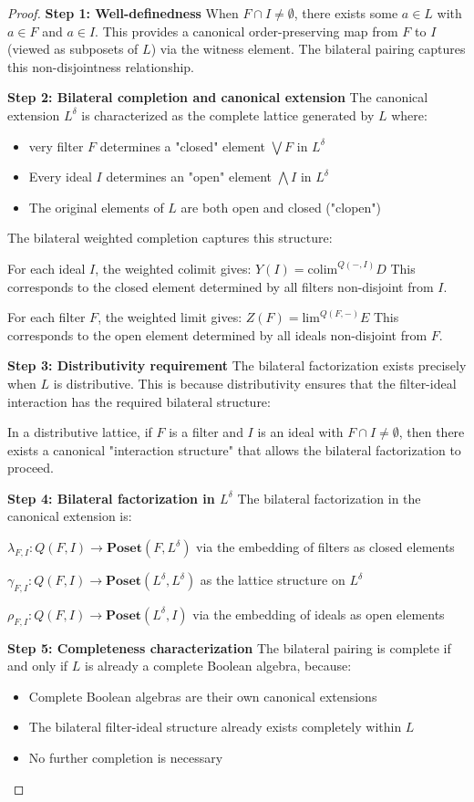 \documentclass[11pt]{article}
\theoremstyle{plain}
\theoremstyle{definition}
\theoremstyle{remark}
\newcommand{\colim}{\mathrm{colim}}
\renewcommand{\lim}{\mathrm{lim}}
\begin{document}
\begin{proof}
\textbf{Step 1: Well-definedness}
When $F \cap I \neq \emptyset$, there exists some $a \in L$ with $a \in F$ and $a \in I$. This provides a canonical order-preserving map from $F$ to $I$ (viewed as subposets of $L$) via the witness element. The bilateral pairing captures this non-disjointness relationship.

\textbf{Step 2: Bilateral completion and canonical extension}
The canonical extension $L^{\delta}$ is characterized as the complete lattice generated by $L$ where:
\begin{itemize}
\item very filter $F$ determines a "closed" element $\bigvee F$ in $L^{\delta}$
\item Every ideal $I$ determines an "open" element $\bigwedge I$ in $L^{\delta}$
\item The original elements of $L$ are both open and closed ("clopen")
\end{itemize}

The bilateral weighted completion captures this structure:

For each ideal $I$, the weighted colimit gives:
$Y(I) = \colim^{Q(-, I)} D$
This corresponds to the closed element determined by all filters non-disjoint from $I$.

For each filter $F$, the weighted limit gives:
$Z(F) = \lim^{Q(F, -)} E$  
This corresponds to the open element determined by all ideals non-disjoint from $F$.

\textbf{Step 3: Distributivity requirement}
The bilateral factorization exists precisely when $L$ is distributive. This is because distributivity ensures that the filter-ideal interaction has the required bilateral structure:

In a distributive lattice, if $F$ is a filter and $I$ is an ideal with $F \cap I \neq \emptyset$, then there exists a canonical "interaction structure" that allows the bilateral factorization to proceed.

\textbf{Step 4: Bilateral factorization in $L^{\delta}$}
The bilateral factorization in the canonical extension is:

$\lambda_{F,I} : Q(F, I) \to \mathbf{Poset}(F, L^{\delta})$ via the embedding of filters as closed elements

$\gamma_{F,I} : Q(F, I) \to \mathbf{Poset}(L^{\delta}, L^{\delta})$ as the lattice structure on $L^{\delta}$

$\rho_{F,I} : Q(F, I) \to \mathbf{Poset}(L^{\delta}, I)$ via the embedding of ideals as open elements

\textbf{Step 5: Completeness characterization}
The bilateral pairing is complete if and only if $L$ is already a complete Boolean algebra, because:
\begin{itemize}
\item Complete Boolean algebras are their own canonical extensions
\item The bilateral filter-ideal structure already exists completely within $L$
\item No further completion is necessary
\end{itemize}
\end{proof}
\end{document}
